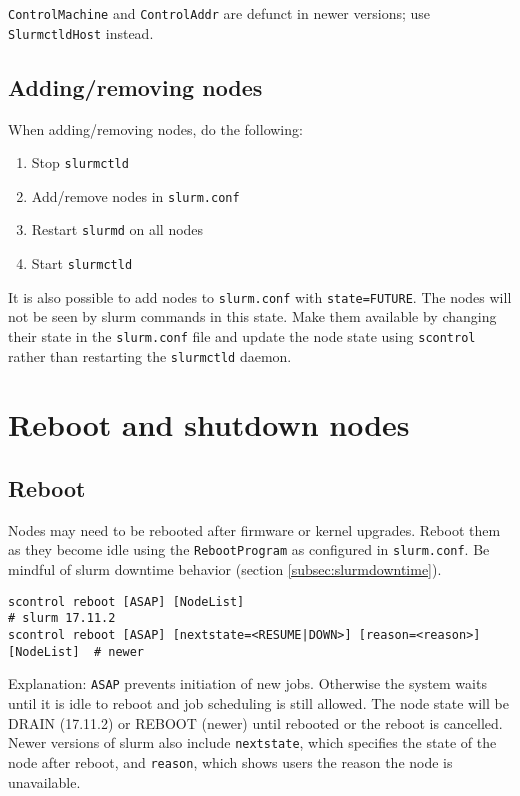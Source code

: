 \texttt{ControlMachine} and \texttt{ControlAddr} are defunct in newer versions; use \texttt{SlurmctldHost} instead.

\subsection{Adding/removing nodes} \label{subsec:addnodes}

When adding/removing nodes, do the following:
\begin{enumerate}
\item Stop \texttt{slurmctld}
\item Add/remove nodes in \texttt{slurm.conf}
\item Restart \texttt{slurmd} on all nodes
\item Start \texttt{slurmctld}
\end{enumerate}

\noindent It is also possible to add nodes to \texttt{slurm.conf} with \texttt{state=FUTURE}. The nodes will not be seen by slurm commands in this state. Make them available by changing their state in the \texttt{slurm.conf} file and update the node state using \texttt{scontrol} rather than restarting the \texttt{slurmctld} daemon.

\section{Reboot and shutdown nodes} \label{sec:slurmpowercycle}

\subsection{Reboot} \label{subsec:slurmreboot}

Nodes may need to be rebooted after firmware or kernel upgrades. Reboot them as they become idle using the \texttt{RebootProgram} as configured in \texttt{slurm.conf}. Be mindful of slurm downtime behavior (section \ref{subsec:slurmdowntime}).

\begin{verbatim}
scontrol reboot [ASAP] [NodeList]                                       # slurm 17.11.2
scontrol reboot [ASAP] [nextstate=<RESUME|DOWN>] [reason=<reason>] [NodeList]  # newer
\end{verbatim}

Explanation: \texttt{ASAP} prevents initiation of new jobs. Otherwise the system waits until it is idle to reboot and job scheduling is still allowed. The node state will be DRAIN (17.11.2) or REBOOT (newer) until rebooted or the reboot is cancelled. Newer versions of slurm also include \texttt{nextstate}, which specifies the state of the node after reboot, and \texttt{reason}, which shows users the reason the node is unavailable.

